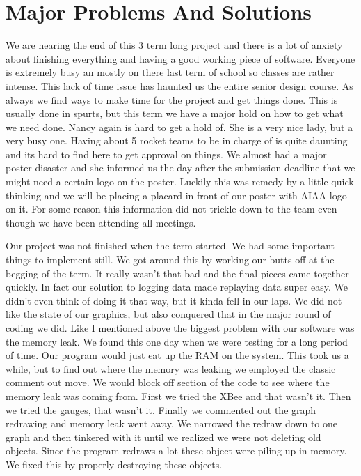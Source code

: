 \documentclass[10pt,draftclsnofoot,onecolumn]{IEEEtran}
\begin{document}
\section{Major Problems And Solutions}
We are nearing the end of this 3 term long project and there is a lot of anxiety about finishing everything and having a good working piece of software. Everyone is extremely busy an mostly on there last term of school so classes are rather intense. This lack of time issue has haunted us the entire senior design course. As always we find ways to make time for the project and get things done. This is usually done in spurts, but this term we have a major hold on how to get what we need done. Nancy again is hard to get a hold of. She is a very nice lady, but a very busy one. Having about 5 rocket teams to be in charge of is quite daunting and its hard to find here to get approval on things. We almost had a major poster disaster and she informed us the day after the submission deadline that we might need a certain logo on the poster. Luckily this was remedy by a little quick thinking and we will be placing a placard in front of our poster with AIAA logo on it. For some reason this information did not trickle down to the team even though we have been attending all meetings. \par

Our project was not finished when the term started. We had some important things to implement still. We got around this by working our butts off at the begging of the term. It really wasn't that bad and the final pieces came together quickly. In fact our solution to logging data made replaying data super easy. We didn't even think of doing it that way, but it kinda fell in our laps. We did not like the state of our graphics, but also conquered that in the major round of coding we did. Like I mentioned above the biggest problem with our software was the memory leak. We found this one day when we were testing for a long period of time. Our program would just eat up the RAM on the system. This took us a while, but to find out where the memory was leaking we employed the classic comment out move. We would block off section of the code to see where the memory leak was coming from. First we tried the XBee and that wasn't it. Then we tried the gauges, that wasn't it. Finally we commented out the graph redrawing and memory leak went away. We narrowed the redraw down to one graph and then tinkered with it until we realized we were not deleting old objects. Since the program redraws a lot these object were piling up in memory. We fixed this by properly destroying these objects.\par
\end{document}
